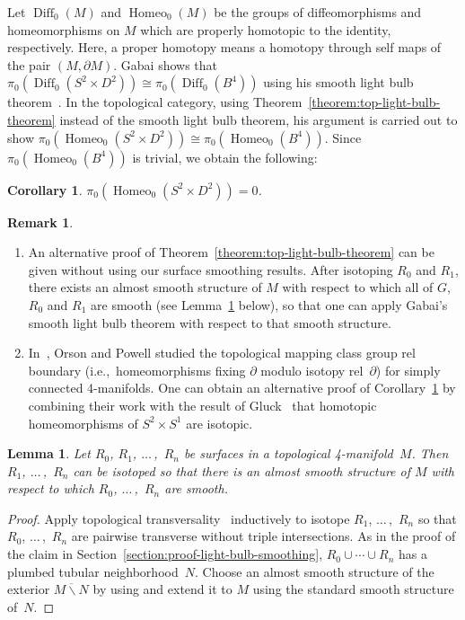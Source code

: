 \documentclass[11pt]{amsart}
\newtheorem{corollary}[theorem]{Corollary}
\newtheorem{lemma}[theorem]{Lemma}
\theoremstyle{definition}
\newtheorem{remark}[theorem]{Remark}
\theoremstyle{theorem-giventitle}
\theoremstyle{definition-giventitle}
\numberwithin{equation}{section}
\def\Diff{\operatorname{Diff}}
\def\Homeo{\operatorname{Homeo}}
\def\setminus{\smallsetminus}
\begin{document}
Let $\Diff_0(M)$ and $\Homeo_0(M)$ be the groups of diffeomorphisms and homeomorphisms on $M$ which are properly homotopic to the identity, respectively.
Here, a proper homotopy means a homotopy through self maps of the pair $(M,\partial M)$.
Gabai shows that $\pi_0(\Diff_0(S^2 \times D^2)) \cong \pi_0(\Diff_0(B^4))$ using his smooth light bulb theorem~\cite{Gabai:2020-1}.
In the topological category, using Theorem~\ref{theorem:top-light-bulb-theorem} instead of the smooth light bulb theorem, his argument is carried out to show $\pi_0(\Homeo_0(S^2 \times D^2)) \cong \pi_0(\Homeo_0(B^4))$.
Since $\pi_0(\Homeo_0(B^4))$ is trivial, we obtain the following:

\begin{corollary}
  \label{corollary:top-mapping-class-S^2xD^2}
  $\pi_0(\Homeo_0(S^2\times D^2)) = 0$.
\end{corollary}

\begin{remark}
  \label{remark:alternative-approach}
  \begin{enumerate}
    \item \label{item:alternative-approach-without-surface-smoothing}
    An alternative proof of Theorem~\ref{theorem:top-light-bulb-theorem} can be given without using our surface smoothing results.
    After isotoping $R_0$ and $R_1$, there exists an almost smooth structure of $M$ with respect to which all of $G$, $R_0$ and $R_1$ are smooth (see Lemma~\ref{lemma:almost-smoothing-rel-surfaces} below), so that one can apply Gabai's smooth light bulb theorem with respect to that smooth structure.
    \item In~\cite{Orson-Powell:2022-1}, Orson and Powell studied the topological mapping class group rel boundary (i.e.,\ homeomorphisms fixing $\partial$ modulo isotopy rel~$\partial$) for simply connected 4-manifolds.
    One can obtain an alternative proof of Corollary~\ref{corollary:top-mapping-class-S^2xD^2} by combining their work with the result of Gluck~\cite{Gluck:1962-1} that homotopic homeomorphisms of $S^2\times S^1$ are isotopic.
  \end{enumerate}
\end{remark}

\begin{lemma}
  \label{lemma:almost-smoothing-rel-surfaces}
  Let $R_0$, $R_1$, $\ldots\,$,~$R_n$ be surfaces in a topological 4-manifold~$M$.
  Then $R_1$, $\ldots\,$,~$R_n$ can be isotoped so that there is an almost smooth structure of $M$ with respect to which $R_0$, $\ldots\,$,~$R_n$ are smooth.
\end{lemma}
\begin{proof}
  Apply topological transversality~\cite[9.5]{Freedman-Quinn:1990-1} inductively to isotope $R_1$, $\ldots\,$,~$R_n$ so that $R_0$, $\ldots\,$,~$R_n$ are pairwise transverse without triple intersections.
  As in the proof of the claim in Section~\ref{section:proof-light-bulb-smoothing}, $R_0\cup\cdots\cup R_n$ has a plumbed tubular neighborhood~$N$.
  Choose an almost smooth structure of the exterior $\overline{M\setminus N}$ by using \cite[8.2]{Freedman-Quinn:1990-1} and extend it to $M$ using the standard smooth structure of~$N$.
\end{proof}
\end{document}

